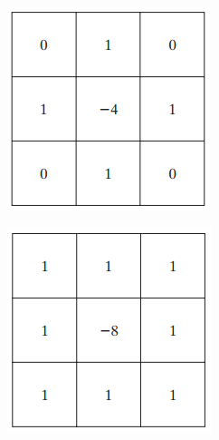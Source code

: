 \begin{figure}[h!]
	\centering
	\begin{subfigure}[b]{0.2\linewidth}
		\includegraphics[width=\linewidth]{myfigure/p2/lap-1.png}
		\caption{}
		\label{fig:lap1}
	\end{subfigure}
	\begin{subfigure}[b]{0.2\linewidth}
    	\includegraphics[width=\linewidth]{myfigure/p2/lap-2.png}

\end{subfigure}
\end{figure}
